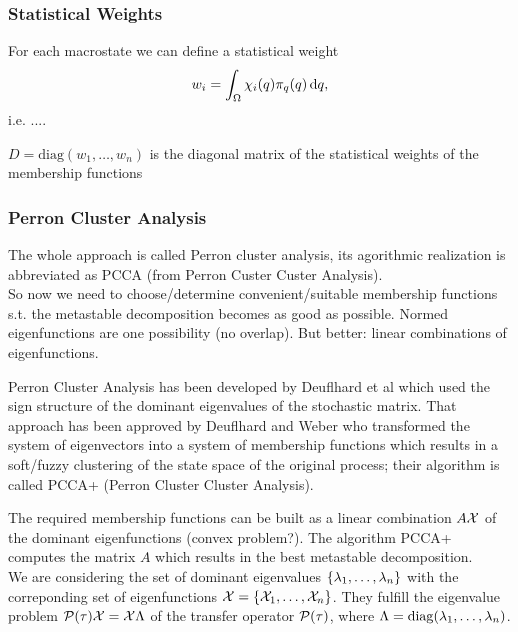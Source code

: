 \subsubsection*{Statistical Weights}

For each macrostate we can define a statistical weight
\begin{equation*}
w_i = \int_\Omega \chi_i(q) \pi_q(q) \mathop{}\!\mathrm{d} q,
\end{equation*}
i.e. ....

$D = \mathrm{diag}(w_1,\dots,w_n)$ is the diagonal matrix of the statistical weights of the membership functions

\subsubsection*{Perron Cluster Analysis}

The  whole approach  is  called Perron  cluster  analysis, its agorithmic  realization is  abbreviated  as  PCCA  (from  Perron  Custer  Custer  Analysis). 
\\

So now we need to choose/determine convenient/suitable membership functions s.t. the metastable decomposition becomes as good as possible. Normed eigenfunctions are one possibility (no overlap). But better: linear combinations of eigenfunctions. 


Perron Cluster Analysis has been developed by Deuflhard et al\cite{deuflhard2000identification} which used the sign structure of the dominant eigenvalues of the stochastic matrix.  That approach has been approved by
Deuflhard and Weber\cite{deuflhard2005robust} 
who transformed the system of eigenvectors into a system of membership functions which results in a soft/fuzzy clustering of the state space of the original process; their algorithm is called PCCA+ (Perron Cluster Cluster Analysis).

The required membership functions can be built as a linear combination $A\mathcal{X}$ of the dominant eigenfunctions (convex problem?).
The algorithm PCCA+ computes the matrix $A$ which results in the best metastable decomposition.
\\

We are considering the set of dominant eigenvalues $\{\lambda_1,\dots,\lambda_n\}$ with the correponding set of eigenfunctions $\mathcal{X} = \{\mathcal{X}_1,\dots,\mathcal{X}_n\}$. They fulfill the eigenvalue problem $\mathcal{P}(\tau) \mathcal{X} = \mathcal{X} \Lambda$ of the transfer operator $\mathcal{P}(\tau)$, where $\Lambda = \mathrm{diag}(\lambda_1,\dots,\lambda_n)$.
\\

